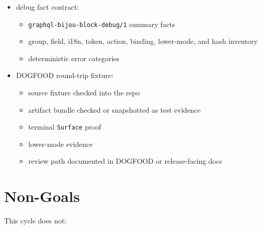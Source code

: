 \begin{itemize}
  \begin{itemize}
  \tightlist
  \item
    source hash
  \item
    artifact hash
  \item
    scene hash
  \item
    packed-cell hash
  \item
    dependency and transform list
  \item
    failure facts for rejected input
  \end{itemize}
\item
  debug fact contract:

  \begin{itemize}
  \tightlist
  \item
    \texttt{g\allowbreak{}r\allowbreak{}a\allowbreak{}p\allowbreak{}h\allowbreak{}q\allowbreak{}l\allowbreak{}-\allowbreak{}b\allowbreak{}i\allowbreak{}j\allowbreak{}o\allowbreak{}u\allowbreak{}-\allowbreak{}b\allowbreak{}l\allowbreak{}o\allowbreak{}c\allowbreak{}k\allowbreak{}-\allowbreak{}d\allowbreak{}e\allowbreak{}b\allowbreak{}u\allowbreak{}g\allowbreak{}/\allowbreak{}1} summary facts
  \item
    group, field, i18n, token, action, binding, lower-mode, and hash inventory
  \item
    deterministic error categories
  \end{itemize}
\item
  DOGFOOD round-trip fixture:

  \begin{itemize}
  \tightlist
  \item
    source fixture checked into the repo
  \item
    artifact bundle checked or snapshotted as test evidence
  \item
    terminal \texttt{S\allowbreak{}u\allowbreak{}r\allowbreak{}f\allowbreak{}a\allowbreak{}c\allowbreak{}e} proof
  \item
    lower-mode evidence
  \item
    review path documented in DOGFOOD or release-facing docs
  \end{itemize}
\end{itemize}

\section{Non-Goals}\label{record-144-non-goals}

This cycle does not:

